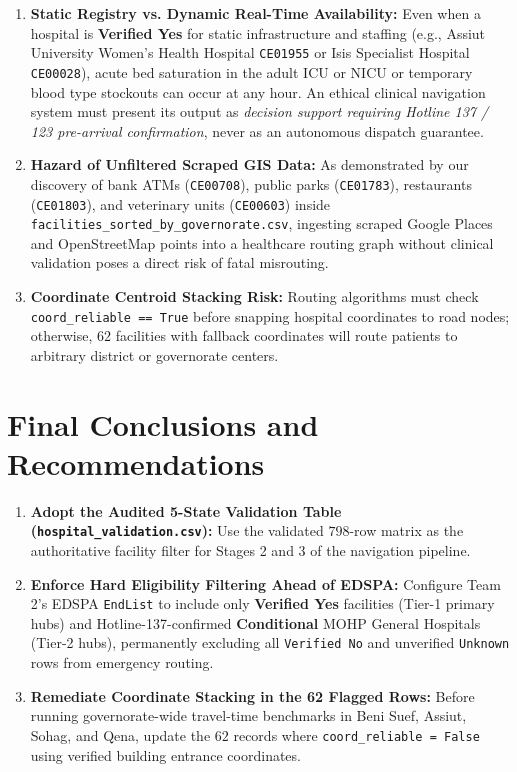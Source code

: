\documentclass[10pt,a4paper]{article}
\begin{document}
\begin{enumerate}
    \item \textbf{Static Registry vs. Dynamic Real-Time Availability:} Even when a hospital is \textbf{Verified Yes} for static infrastructure and staffing (e.g., Assiut University Women's Health Hospital \texttt{CE01955} or Isis Specialist Hospital \texttt{CE00028}), acute bed saturation in the adult ICU or NICU or temporary blood type stockouts can occur at any hour. An ethical clinical navigation system must present its output as \textit{decision support requiring Hotline 137 / 123 pre-arrival confirmation}, never as an autonomous dispatch guarantee.
    \item \textbf{Hazard of Unfiltered Scraped GIS Data:} As demonstrated by our discovery of bank ATMs (\texttt{CE00708}), public parks (\texttt{CE01783}), restaurants (\texttt{CE01803}), and veterinary units (\texttt{CE00603}) inside \texttt{facilities\_sorted\_by\_governorate.csv}, ingesting scraped Google Places and OpenStreetMap points into a healthcare routing graph without clinical validation poses a direct risk of fatal misrouting.
    \item \textbf{Coordinate Centroid Stacking Risk:} Routing algorithms must check \texttt{coord\_reliable == True} before snapping hospital coordinates to road nodes; otherwise, $62$ facilities with fallback coordinates will route patients to arbitrary district or governorate centers.
\end{enumerate}

\section{Final Conclusions and Recommendations}

\begin{enumerate}
    \item \textbf{Adopt the Audited 5-State Validation Table (\texttt{hospital\_validation.csv}):} Use the validated $798$-row matrix as the authoritative facility filter for Stages 2 and 3 of the navigation pipeline.
    \item \textbf{Enforce Hard Eligibility Filtering Ahead of EDSPA:} Configure Team 2's EDSPA \texttt{EndList} to include only \textbf{Verified Yes} facilities (Tier-1 primary hubs) and Hotline-137-confirmed \textbf{Conditional} MOHP General Hospitals (Tier-2 hubs), permanently excluding all \texttt{Verified No} and unverified \texttt{Unknown} rows from emergency routing.
    \item \textbf{Remediate Coordinate Stacking in the 62 Flagged Rows:} Before running governorate-wide travel-time benchmarks in Beni Suef, Assiut, Sohag, and Qena, update the $62$ records where \texttt{coord\_reliable = False} using verified building entrance coordinates.
\end{enumerate}



\end{document}
